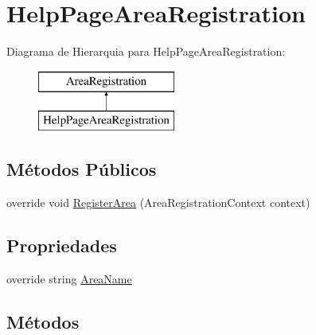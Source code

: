 \hypertarget{classApi3Layers_1_1Areas_1_1HelpPage_1_1HelpPageAreaRegistration}{}\section{Help\+Page\+Area\+Registration}
\label{classApi3Layers_1_1Areas_1_1HelpPage_1_1HelpPageAreaRegistration}
Diagrama de Hierarquia para Help\+Page\+Area\+Registration\+:\begin{figure}[H]
\begin{center}
\leavevmode
\includegraphics[height=2.000000cm]{classApi3Layers_1_1Areas_1_1HelpPage_1_1HelpPageAreaRegistration}
\end{center}
\end{figure}
\subsection*{Métodos Públicos}
\begin{DoxyCompactItemize}
\item 
override void \hyperlink{classApi3Layers_1_1Areas_1_1HelpPage_1_1HelpPageAreaRegistration_a7c67c594ee2be5522d6bb422ba337e94}{Register\+Area} (Area\+Registration\+Context context)
\end{DoxyCompactItemize}
\subsection*{Propriedades}
\begin{DoxyCompactItemize}
\item 
override string \hyperlink{classApi3Layers_1_1Areas_1_1HelpPage_1_1HelpPageAreaRegistration_acf6f429626f20687e61c64d5d5dd9f6d}{Area\+Name}
\end{DoxyCompactItemize}


\subsection{Métodos}
\mbox{\label{classApi3Layers_1_1Areas_1_1HelpPage_1_1HelpPageAreaRegistration_a7c67c594ee2be5522d6bb422ba337e94}} 
